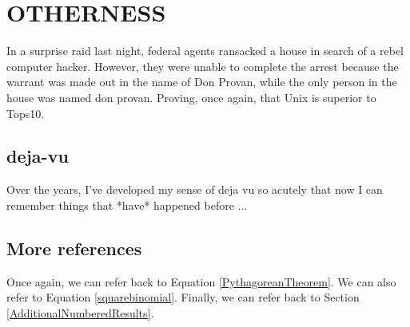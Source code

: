 \chapter{\texorpdfstring{OTHERNESS}{}} %
\setcounter{equation}{0} 

In a surprise raid last night, federal agents ransacked a house in search
of a rebel computer hacker.  However, they were unable to complete the arrest
because the warrant was made out in the name of Don Provan, while the only
person in the house was named don provan.  Proving, once again, that Unix is
superior to Tops10.

\section{deja-vu}

Over the years, I've developed my sense of deja vu so acutely that now
I can remember things that *have* happened before ...

\section{More references}

Once again, we can refer back to Equation \ref{PythagoreanTheorem}.
We can also refer to Equation \ref{squarebinomial}.
Finally, we can refer back to Section \ref{AdditionalNumberedResults}.





